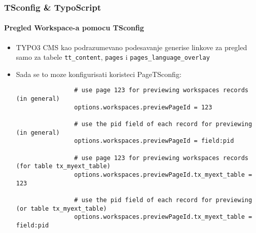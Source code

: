 \begin{frame}[fragile]
	\frametitle{TSconfig \& TypoScript}
	\framesubtitle{Pregled Workspace-a pomocu TSconfig}

	\lstset{basicstyle=\tiny\ttfamily}

	\begin{itemize}

		\item TYPO3 CMS kao podrazumevano podesavanje generise linkove za pregled samo za tabele \texttt{tt\_content}, \texttt{pages} i
			\texttt{pages\_language\_overlay}

		\item Sada se to moze konfigurisati koristeci PageTSconfig:

			\begin{lstlisting}
				# use page 123 for previewing workspaces records (in general)
				options.workspaces.previewPageId = 123

				# use the pid field of each record for previewing (in general)
				options.workspaces.previewPageId = field:pid

				# use page 123 for previewing workspaces records (for table tx_myext_table)
				options.workspaces.previewPageId.tx_myext_table = 123

				# use the pid field of each record for previewing (or table tx_myext_table)
				options.workspaces.previewPageId.tx_myext_table = field:pid
			\end{lstlisting}

	\end{itemize}

\end{frame}


